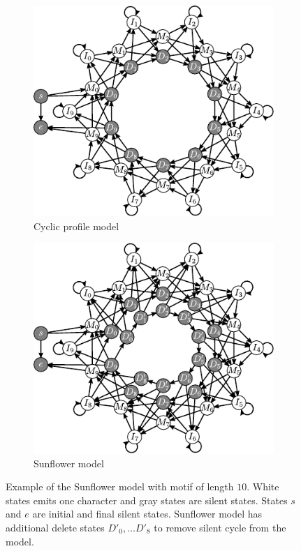 \begin{figure}
\begin{center}
\begin{subfigure}[b]{0.5\textwidth}
\includegraphics{../figures/SunflowerSilentCircle.pdf}
\caption{Cyclic profile model}\label{SUBFIGURE:SUNFLOWERSILENTCYCLE}
\end{subfigure}%
\begin{subfigure}[b]{0.5\textwidth}
\includegraphics{../figures/Sunflower.pdf}
\caption{Sunflower model}\label{SUBFIGURE:SUNFLOWER}
\end{subfigure}
\end{center}
\caption[Example of the Sunflower model]{Example of the Sunflower model 
with motif of length $10$. White states emits one character and gray states are
silent states. States $s$ and $e$ are initial and final silent states. Sunflower model
has additional delete states $D'_0, \dots D'_8$ to remove silent cycle from the
model.}
\label{FIGURE:SUNFLOWERMODEL}
\end{figure}

